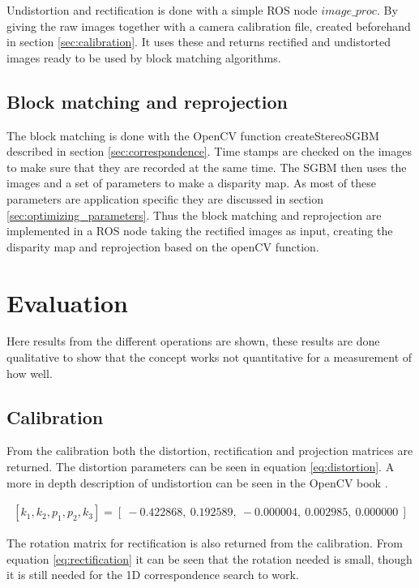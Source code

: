 Undistortion and rectification is done with a simple ROS node $image\_proc$. By giving the raw images together with a camera calibration file, created beforehand in section \ref{sec:calibration}. It uses these and returns rectified and undistorted images ready to be used by block matching algorithms.

\subsection{Block matching and reprojection}

The block matching is done with the OpenCV function createStereoSGBM \cite{opencv} described in section \ref{sec:correspondence}. Time stamps are checked on the images to make sure that they are recorded at the same time. The SGBM then uses the images and a set of parameters to make a disparity map. As most of these parameters are application specific they are discussed in section \ref{sec:optimizing_parameters}. Thus the block matching and reprojection are implemented in a ROS node taking the rectified images as input, creating the disparity map and reprojection based on the openCV function.
 
\section{Evaluation}
Here results from the different operations are shown, these results are done qualitative to show that the concept works not quantitative for a measurement of how well.

\subsection{Calibration}
From the calibration both the distortion, rectification and projection matrices are returned. The distortion parameters can be seen in equation \ref{eq:distortion}. A more in depth description of undistortion can be seen in the OpenCV book \cite{locv}.

\begin{equation}\label{eq:distortion}
\begin{split}
[ k_{1}, k_{2}, p_{1}, p_{2}, k_{3} ] = [\ -0.422868,\ 0.192589,\ -0.000004,\ 0.002985,\ 0.000000\ ]
\end{split}
\end{equation} 

The rotation matrix for rectification is also returned from the calibration. From equation \ref{eq:rectification} it can be seen that the rotation needed is small, though it is still needed for the 1D correspondence search to work. 

